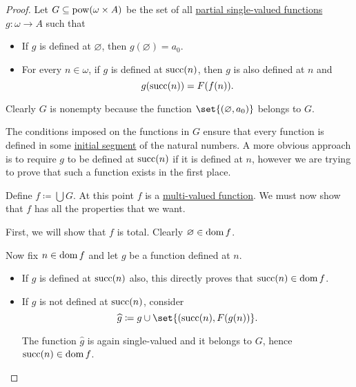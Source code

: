 \begin{proof}
  Let \( G \subseteq \operatorname{pow}(\omega \times A) \) be the set of all \hyperref[def:partial_function]{partial single-valued functions} \( g: \omega \to A \) such that
  \begin{itemize}
    \item If \( g \) is defined at \( \varnothing \), then \( g(\varnothing) = a_0 \).
    \item For every \( n \in \omega \), if \( g \) is defined at \( \operatorname{succ}(n) \), then \( g \) is also defined at \( n \) and
    \begin{equation*}
      g(\operatorname{succ}(n)) = F(f(n)).
    \end{equation*}
  \end{itemize}

  Clearly \( G \) is nonempty because the function \( \set{ (\varnothing, a_0) } \) belongs to \( G \).

  The conditions imposed on the functions in \( G \) ensure that every function is defined in some \hyperref[def:poset_interval/ray]{initial segment} of the natural numbers. A more obvious approach is to require \( g \) to be defined at \( \operatorname{succ}(n) \) if it is defined at \( n \), however we are trying to prove that such a function exists in the first place.

  Define \( f \coloneqq \bigcup G \). At this point \( f \) is a \hyperref[def:multi_valued_function]{multi-valued function}. We must now show that \( f \) has all the properties that we want.

   First, we will show that \( f \) is total. Clearly \( \varnothing \in \operatorname{dom} f \).

  Now fix \( n \in \operatorname{dom} f \) and let \( g \) be a function defined at \( n \).

  \begin{itemize}
    \item If \( g \) is defined at \( \operatorname{succ}(n) \) also, this directly proves that \( \operatorname{succ}(n) \in \operatorname{dom} f \).
    \item If \( g \) is not defined at \( \operatorname{succ}(n) \), consider
    \begin{equation*}
      \widehat g \coloneqq g \cup \set{ (\op{succ}(n), F(g(n)) }.
    \end{equation*}

    The function \( \widehat g \) is again single-valued and it belongs to \( G \), hence \( \operatorname{succ}(n) \in \operatorname{dom} f \).
  \end{itemize}


\end{proof}
